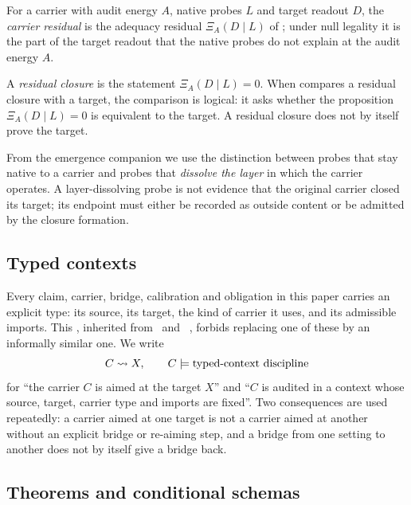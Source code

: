 \begin{definition}\label{def:carrier-residual}
For a carrier with audit energy \(A\), native probes \(L\) and target
readout \(D\), the \emph{carrier residual} is the adequacy residual
\(\Xi_{A}(D\mid L)\) of \cite{Tsiokos2026XiCompanion}; under null
legality it is the part of the target readout that the native probes do
not explain at the audit energy \(A\).
\end{definition}

A \emph{residual closure} is the statement \(\Xi_{A}(D\mid L)=0\).
When  compares a residual closure with a target,
the comparison is logical: it asks whether the proposition
\(\Xi_{A}(D\mid L)=0\) is equivalent to the target.  A residual closure
does not by itself prove the target.

From the emergence companion \cite{Tsiokos2026NeedleKiller} we use the
distinction between probes that stay native to a carrier and probes that
\emph{dissolve the layer} in which the carrier operates.  A
layer-dissolving probe is not evidence that the original carrier closed
its target; its endpoint must either be recorded as outside content or
be admitted by the closure formation.

\subsection{Typed contexts}\label{sec:apparatus:typed-context}

Every claim, carrier, bridge, calibration and obligation in this paper
carries an explicit type: its source, its target, the kind of carrier
it uses, and its admissible imports.  This \emph{\TCD}, inherited from
\FTwo\ and \FThree\
\cite{Tsiokos2026FoundationsII,Tsiokos2026FoundationsIII}, forbids
replacing one of these by an informally similar one.  We write
\[
  C\leadsto X,\qquad C\models\text{typed-context discipline}
\]
for ``the carrier \(C\) is aimed at the target \(X\)'' and ``\(C\) is
audited in a context whose source, target, carrier type and imports are
fixed''.  Two consequences are used repeatedly: a carrier aimed at one
target is not a carrier aimed at another without an explicit bridge or
re-aiming step, and a bridge from one setting to another does not by
itself give a bridge back.

\subsection{Theorems and conditional schemas}\label{sec:apparatus:opacity-guards}

